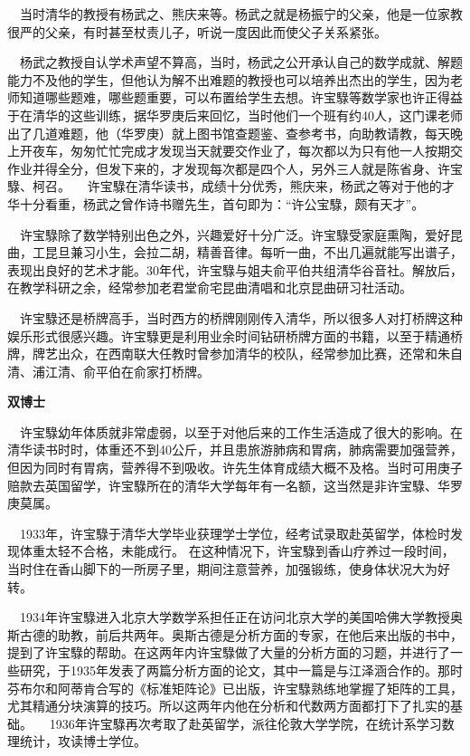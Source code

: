 \documentclass[a4paper,AutoFakeBold,oneside,12pt]{article}
\begin{document}
$\quad$当时清华的教授有杨武之、熊庆来等。杨武之就是杨振宁的父亲，他是一位家教很严的父亲，有时甚至杖责儿子，听说一度因此而使父子关系紧张。

$\quad$杨武之教授自认学术声望不算高，当时，杨武之公开承认自己的数学成就、解题能力不及他的学生，但他认为解不出难题的教授也可以培养出杰出的学生，因为老师知道哪些题难，哪些题重要，可以布置给学生去想。许宝騄等数学家也许正得益于在清华的这些训练，据华罗庚后来回忆，当时他们一个班有约40人，这门课老师出了几道难题，他（华罗庚）就上图书馆查题鉴、查参考书，向助教请教，每天晚上开夜车，匆匆忙忙完成才发现当天就要交作业了，每次都以为只有他一人按期交作业并得全分，但发下来的，才发现每次都是四个人，另外三人就是陈省身、许宝騄、柯召。
	$\quad$许宝騄在清华读书，成绩十分优秀，熊庆来，杨武之等对于他的才华十分看重，杨武之曾作诗书赠先生，首句即为：“许公宝騄，颇有天才”。

$\quad$许宝騄除了数学特别出色之外，兴趣爱好十分广泛。许宝騄受家庭熏陶，爱好昆曲，工昆旦兼习小生，会拉二胡，精善音律。每听一曲，不出几遍就能写出谱子，表现出良好的艺术才能。30年代，许宝騄与姐夫俞平伯共组清华谷音社。解放后，在教学科研之余，经常参加老君堂俞宅昆曲清唱和北京昆曲研习社活动。

$\quad$许宝騄还是桥牌高手，当时西方的桥牌刚刚传入清华，所以很多人对打桥牌这种娱乐形式很感兴趣。许宝騄更是利用业余时间钻研桥牌方面的书籍，以至于精通桥牌，牌艺出众，在西南联大任教时曾参加清华的校队，经常参加比赛，还常和朱自清、浦江清、俞平伯在俞家打桥牌。

	\textbf{双博士}

$\quad$许宝騄幼年体质就非常虚弱，以至于对他后来的工作生活造成了很大的影响。在清华读书时时，体重还不到40公斤，并且患旅游肺病和胃病，肺病需要加强营养，但因为同时有胃病，营养得不到吸收。许先生体育成绩大概不及格。当时可用庚子赔款去英国留学，许宝騄所在的清华大学每年有一名额，这当然是非许宝騄、华罗庚莫属。

$\quad$1933年，许宝騄于清华大学毕业获理学士学位，经考试录取赴英留学，体检时发现体重太轻不合格，未能成行。
在这种情况下，许宝騄到香山疗养过一段时间，当时住在香山脚下的一所房子里，期间注意营养，加强锻练，使身体状况大为好转。

$\quad$1934年许宝騄进入北京大学数学系担任正在访问北京大学的美国哈佛大学教授奥斯古德的助教，前后共两年。奥斯古德是分析方面的专家，在他后来出版的书中，提到了许宝騄的帮助。在这两年内许宝騄做了大量的分析方面的习题，并进行了一些研究，于1935年发表了两篇分析方面的论文，其中一篇是与江泽涵合作的。那时芬布尔和阿蒂肯合写的《标准矩阵论》已出版，许宝騄熟练地掌握了矩阵的工具，尤其精通分块演算的技巧。所以这两年内他在分析和代数两方面都打下了扎实的基础。
	$\quad$1936年许宝騄再次考取了赴英留学，派往伦敦大学学院，在统计系学习数理统计，攻读博士学位。
\end{document}
